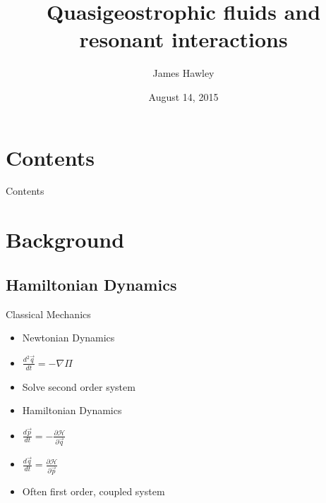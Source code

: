 \documentclass{beamer}
\title{Quasigeostrophic fluids and resonant interactions}
\author{James Hawley}
\date{August 14, 2015}
\institute{University of Waterloo}
\begin{document}
	\begin{frame}
		\titlepage
	\end{frame}

	\section*{Contents}
		\begin{frame}{Contents}
			\tableofcontents
		\end{frame}

	\section{Background}
		\subsection{Hamiltonian Dynamics}
			\begin{frame}[t]{Classical Mechanics}
				\begin{minipage}{0.45\textwidth}
					\begin{itemize}
						\item<2-> Newtonian Dynamics
						\item<3-> $\frac{d^2 \vec q}{dt} = -\nabla \Pi$
						\item<3-> Solve second order system
					\end{itemize}
				\end{minipage}
				\begin{minipage}{0.45\textwidth}
					\begin{itemize}
						\item<4-> Hamiltonian Dynamics
						\item<5-> $\frac{d \vec p}{dt} = -\frac{\partial \mathcal{H}}{\partial \vec q}$
						\item<5-> $\frac{d \vec q}{dt} = \frac{\partial \mathcal{H}}{\partial \vec p}$
						\item<5-> Often first order, coupled system
					\end{itemize}
				\end{minipage}
			\end{frame}
\end{document}
